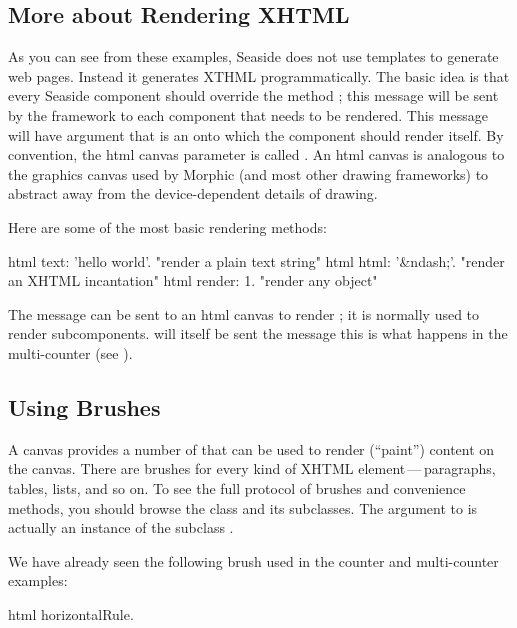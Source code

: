 \documentclass[a4paper,10pt,twoside]{book}
\begin{document}
\subsection{More about Rendering XHTML}

As you can see from these examples, Seaside does not use templates to generate web pages.
Instead it generates XTHML programmatically.
The basic idea is that every Seaside component should override the method ; this message will be sent by the framework to each component that needs to be rendered.
This  message will have argument that is an   onto which the component should render itself.  By convention, the html canvas parameter is called .
An html canvas is analogous to the graphics canvas used by Morphic (and most other drawing frameworks) to abstract away from the device-dependent details of drawing.
 

Here are some of the most basic rendering methods:
\begin{code}{}
html text: 'hello world'.  "render a plain text string"
html html: '&ndash;'.     "render an XHTML incantation"
html render: 1.              "render any object"
\end{code}

The message  can be sent to an html canvas to render ; it is normally used to render subcomponents.   will itself be sent the message 
this is what happens in the multi-counter (see ).

\subsection{Using Brushes}

A canvas provides a number of  that can be used to render (\ie ``paint'') content on the canvas.
There are brushes for every kind of XHTML element\,---\,paragraphs, tables, lists, and so on.
To see the full protocol of brushes and convenience methods, you should browse the class  and its subclasses.
The argument to  is actually an instance of the subclass .

We have already seen the following brush used in the counter and multi-counter examples:
\begin{code}{}
html horizontalRule.
\end{code}
\end{document}
